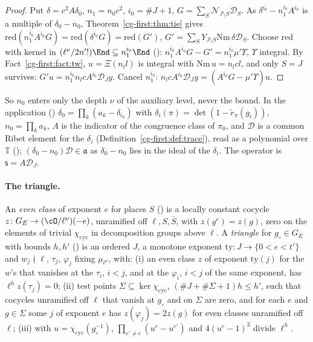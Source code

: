 \begin{proof}
Put $\delta=c^2A\delta_0$, $n_1=n_0c^2$, $i_0=\#J+1$, $G=\sum_S\mathcal N_{J\setminus S}\mathcal D_S$. As
$\delta^{i_0}-n_1^{i_0}A^{i_0}$ is a multiple of $\delta_0-n_0$, Theorem~\ref{cg-first:thm:tie} gives
$\mathrm{red}(n_1^{i_0}A^{i_0}G)=\mathrm{red}(\delta^{i_0}G)=\mathrm{red}(G')$, $G'=\sum_SY_{J\setminus S}\mathrm{Nm}\,\delta\mathcal D_S$.
Choose $\mathrm{red}$ with kernel in $(\ell^\nu/2n'!)\End\subseteq n_1^{i_0}\End$
(): $n_1^{i_0}A^{i_0}G-G'=n_1^{i_0}\mu'\Upsilon$, $\Upsilon$ integral. By
Fact~\ref{cg-first:fact:tw}, $u=\Xi(n_ll)$ is integral with $\mathrm{Nm}\,u=n_lcl$, and only $S=J$
survives: $G'u=n_1^{i_0}n_lcA^{i_0}\mathcal D_Jy$. Cancel $n_1^{i_0}$:
$n_lcA^{i_0}\mathcal D_Jy=(A^{i_0}G-\mu'\Upsilon)u$.
\end{proof}

So $n_0$ enters only the depth $\nu$ of the auxiliary level, never the bound. In the application
() $\delta_0=\prod_k(a_k-\delta_{i_k})$
with $\delta_i(\pi)=\det(1-\tilde r_\pi(g_i))$, $n_0=\prod_ka_k$, $A$ is the indicator of the congruence class of
$\pi_0$, and $\mathcal D$ is a common Ribet element for the $\delta_i$ (Definition~\ref{cg-first:def:trace}),
read as a polynomial over $\mathbb T$ ();
$(\delta_0-n_0)\mathcal D\in\mathfrak a$ as $\delta_0-n_0$ lies in the ideal of the $\delta_i$. The
operator is $\mathsf s=A\mathcal D_J$.

\paragraph{The triangle.} An \emph{even class} of exponent $e$ for places $S$
() is a locally constant cocycle $z\colon G_E\to(\cO/\ell^\nu)(-e)$,
unramified off $\ell,S,\bar S$, with $z(g^c)=z(g)$, zero on the elements of trivial
$\chi_{\mathrm{cyc}}$ in decomposition groups above $\ell$. A \emph{triangle} for $g_\circ\in G_E$ with bounds
$h,h'$ () is an ordered $J$, a monotone exponent
$\mathrm{ty}\colon J\to\{0<e<t'\}$ and $w_j\nmid\ell$, $\tau_j$, $\varphi_j$ fixing $\mu_{\ell^\nu}$, with:
(i) an even class $z$ of exponent $\mathrm{ty}(j)$ for the $w$'s that vanishes at the $\tau_i$, $i<j$,
and at the $\varphi_i$, $i<j$ of the same exponent, has $\ell^hz(\tau_j)=0$; (ii) test points
$\Sigma\subseteq\ker\chi_{\mathrm{cyc}}$, $(\#J+\#\Sigma+1)h\le h'$, such that cocycles unramified off
$\ell$ that vanish at $g_\circ$ and on $\Sigma$ are zero, and for each $e$ and $g\in\Sigma$ some $j$ of exponent $e$ has
$z(\varphi_j)=2z(g)$ for even classes unramified off $\ell$; (iii) with $u=\chi_{\mathrm{cyc}}(g_\circ^{-1})$,
$\prod_{e'\neq e}(u^e-u^{e'})$ and $4(u^e-1)^2$ divide $\ell^h$.

